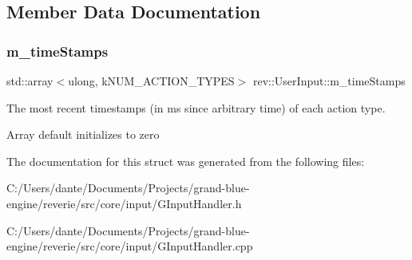 \subsection{Member Data Documentation}
\mbox{\label{structrev_1_1_user_input_ab4af0c36ad391ebe88f4a61a9768e636}} 
\subsubsection{\texorpdfstring{m\_timeStamps}{m\_timeStamps}}
{\footnotesize\ttfamily std\+::array$<$ulong, k\+N\+U\+M\+\_\+\+A\+C\+T\+I\+O\+N\+\_\+\+T\+Y\+P\+ES$>$ rev\+::\+User\+Input\+::m\+\_\+time\+Stamps}



The most recent timestamps (in ms since arbitrary time) of each action type. 

Array default initializes to zero 

The documentation for this struct was generated from the following files\+:\begin{DoxyCompactItemize}
\item 
C\+:/\+Users/dante/\+Documents/\+Projects/grand-\/blue-\/engine/reverie/src/core/input/G\+Input\+Handler.\+h\item 
C\+:/\+Users/dante/\+Documents/\+Projects/grand-\/blue-\/engine/reverie/src/core/input/G\+Input\+Handler.\+cpp\end{DoxyCompactItemize}
